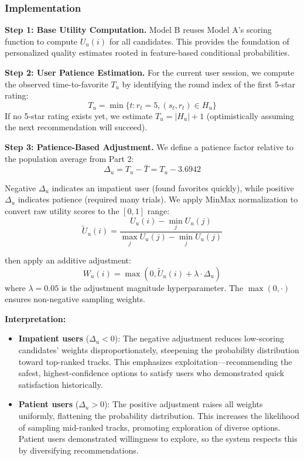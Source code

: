 \documentclass[12pt,a4paper]{article}
\begin{document}
\subsubsection{Implementation}

\textbf{\indent Step 1: Base Utility Computation.} Model B reuses Model A's scoring function to compute $U_u(i)$ for all candidates. This provides the foundation of personalized quality estimates rooted in feature-based conditional probabilities.

\textbf{Step 2: User Patience Estimation.} For the current user session, we compute the observed time-to-favorite $T_u$ by identifying the round index of the first 5-star rating:
\begin{equation}
T_u = \min\{t : r_t = 5, (s_t, r_t) \in H_u\}
\end{equation}
If no 5-star rating exists yet, we estimate $T_u = |H_u| + 1$ (optimistically assuming the next recommendation will succeed).

\textbf{Step 3: Patience-Based Adjustment.} We define a patience factor relative to the population average from Part 2:
\begin{equation}
\Delta_u = T_u - \bar{T} = T_u - 3.6942
\end{equation}

Negative $\Delta_u$ indicates an impatient user (found favorites quickly), while positive $\Delta_u$ indicates patience (required many trials). We apply MinMax normalization to convert raw utility scores to the $[0,1]$ range:
\begin{equation}
\tilde{U}_u(i) = \frac{U_u(i) - \min_j U_u(j)}{\max_j U_u(j) - \min_j U_u(j)}
\end{equation}

then apply an additive adjustment:
\begin{equation}
W_u(i) = \max\left(0, \tilde{U}_u(i) + \lambda \cdot \Delta_u\right)
\end{equation}
where $\lambda = 0.05$ is the adjustment magnitude hyperparameter. The $\max(0, \cdot)$ ensures non-negative sampling weights.

\textbf{Interpretation:}
\begin{itemize}
    \item \textbf{Impatient users} ($\Delta_u < 0$): The negative adjustment reduces low-scoring candidates' weights disproportionately, steepening the probability distribution toward top-ranked tracks. This emphasizes exploitation—recommending the safest, highest-confidence options to satisfy users who demonstrated quick satisfaction historically.
    
    \item \textbf{Patient users} ($\Delta_u > 0$): The positive adjustment raises all weights uniformly, flattening the probability distribution. This increases the likelihood of sampling mid-ranked tracks, promoting exploration of diverse options. Patient users demonstrated willingness to explore, so the system respects this by diversifying recommendations.
\end{itemize}
\end{document}
